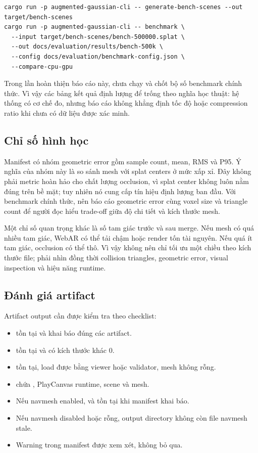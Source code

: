 \begin{lstlisting}[language={}]
cargo run -p augmented-gaussian-cli -- generate-bench-scenes --out target/bench-scenes
cargo run -p augmented-gaussian-cli -- benchmark \
  --input target/bench-scenes/bench-500000.splat \
  --out docs/evaluation/results/bench-500k \
  --config docs/evaluation/benchmark-config.json \
  --compare-cpu-gpu
\end{lstlisting}

Trong lần hoàn thiện báo cáo này, chưa chạy và chốt bộ số benchmark chính thức. Vì vậy các bảng kết quả định lượng để trống theo nghĩa học thuật: hệ thống có cơ chế đo, nhưng báo cáo không khẳng định tốc độ hoặc compression ratio khi chưa có dữ liệu được xác minh.

\subsection{Chỉ số hình học}

Manifest có nhóm geometric error gồm sample count, mean, RMS và P95. Ý nghĩa của nhóm này là so sánh mesh với splat centers ở mức xấp xỉ. Đây không phải metric hoàn hảo cho chất lượng occlusion, vì splat center không luôn nằm đúng trên bề mặt; tuy nhiên nó cung cấp tín hiệu định lượng ban đầu. Với benchmark chính thức, nên báo cáo geometric error cùng voxel size và triangle count để người đọc hiểu trade-off giữa độ chi tiết và kích thước mesh.

Một chỉ số quan trọng khác là số tam giác trước và sau merge. Nếu mesh có quá nhiều tam giác, WebAR có thể tải chậm hoặc render tốn tài nguyên. Nếu quá ít tam giác, occlusion có thể thô. Vì vậy không nên chỉ tối ưu một chiều theo kích thước file; phải nhìn đồng thời collision triangles, geometric error, visual inspection và hiệu năng runtime.

\subsection{Đánh giá artifact}

Artifact output cần được kiểm tra theo checklist:

\begin{itemize}
  \item {} tồn tại và khai báo đúng các artifact.
  \item \artifact{scene.sog} tồn tại và có kích thước khác 0.
  \item {} tồn tại, load được bằng viewer hoặc validator, mesh không rỗng.
  \item {} chứa , PlayCanvas runtime, scene và mesh.
  \item Nếu navmesh enabled, \artifact{navmesh.glb} và  tồn tại khi manifest khai báo.
  \item Nếu navmesh disabled hoặc rỗng, output directory không còn file navmesh stale.
  \item Warning trong manifest được xem xét, không bỏ qua.
\end{itemize}

